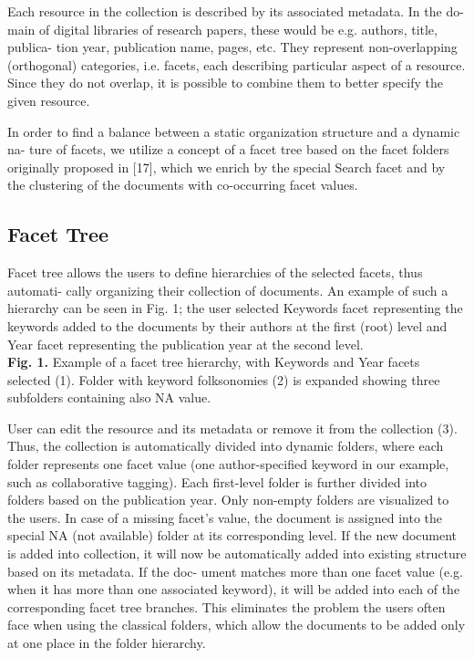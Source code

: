 \documentclass{llncs}
\begin{document}
Each resource in the collection is described by its associated metadata. In the do- main of digital libraries of research papers, these would be e.g. authors, title, publica- tion year, publication name, pages, etc. They represent non-overlapping (orthogonal) categories, i.e. facets, each describing particular aspect of a resource. Since they do not overlap, it is possible to combine them to better specify the given resource.

In order to find a balance between a static organization structure and a dynamic na- ture of facets, we utilize a concept of a facet tree based on the facet folders originally proposed in [17], which we enrich by the special Search facet and by the clustering of the documents with co-occurring facet values.

\subsection{Facet Tree}

Facet tree allows the users to define hierarchies of the selected facets, thus automati- cally organizing their collection of documents. An example of such a hierarchy can be seen in Fig. 1; the user selected Keywords facet representing the keywords added to the documents by their authors at the first (root) level and Year facet representing the publication year at the second level.\\

\textbf{Fig. 1.} Example of a facet tree hierarchy, with Keywords and Year facets selected (1). Folder with keyword folksonomies (2) is expanded showing three subfolders containing also NA value.

User can edit the resource and its metadata or remove it from the collection (3).
Thus, the collection is automatically divided into dynamic folders, where each folder represents one facet value (one author-specified keyword in our example, such as collaborative tagging). Each first-level folder is further divided into folders based on the publication year. Only non-empty folders are visualized to the users. In case of a missing facet’s value, the document is assigned into the special NA (not available) folder at its corresponding level. If the new document is added into collection, it will now be automatically added into existing structure based on its metadata. If the doc- ument matches more than one facet value (e.g. when it has more than one associated keyword), it will be added into each of the corresponding facet tree branches. This eliminates the problem the users often face when using the classical folders, which allow the documents to be added only at one place in the folder hierarchy.
\end{document}
